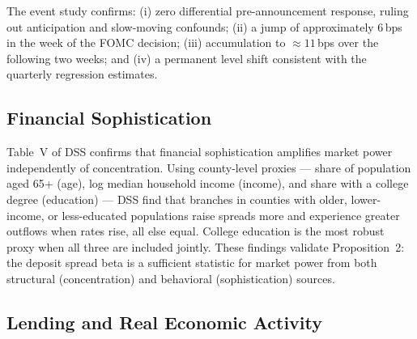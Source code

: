 \documentclass[12pt,a4paper]{article}
\begin{document}
The event study confirms: (i) zero differential pre-announcement response,
ruling out anticipation and slow-moving confounds; (ii) a jump of approximately
6\,bps in the week of the FOMC decision; (iii) accumulation to $\approx 11$\,bps
over the following two weeks; and (iv) a permanent level shift consistent with
the quarterly regression estimates.

\subsection{Financial Sophistication}

Table~V of DSS confirms that financial sophistication amplifies market power
independently of concentration. Using county-level proxies --- share of
population aged 65+ (age), log median household income (income), and share
with a college degree (education) --- DSS find that branches in counties with
older, lower-income, or less-educated populations raise spreads more and
experience greater outflows when rates rise, all else equal. College education
is the most robust proxy when all three are included jointly. These findings
validate Proposition~2: the deposit spread beta is a sufficient statistic for
market power from both structural (concentration) and behavioral (sophistication)
sources.

\subsection{Lending and Real Economic Activity}
\end{document}
